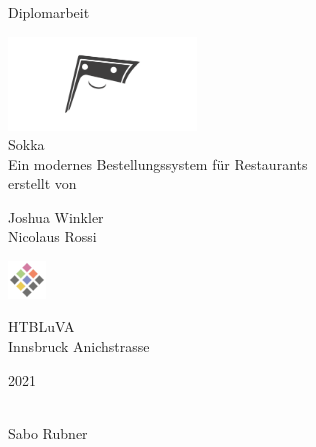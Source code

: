\begin{titlepage}
	\begin{center}
		\Large{Diplomarbeit} \\
		
		\bigskip
		\bigskip
		\bigskip

		\includegraphics[width=5cm]{../images/sokka.png} \\
		\Huge{Sokka} \\
		\bigskip
		\bigskip
		\bigskip
		\huge{Ein modernes Bestellungssystem für Restaurants} \\

		\bigskip
		\bigskip
		\bigskip
		\large{erstellt von} \\

		\bigskip
		\bigskip
		\bigskip
		
		\Huge{Joshua Winkler} \\
		\Huge{Nicolaus Rossi} \\
		\bigskip
		\bigskip
		\bigskip

		
		\bigskip
	    \bigskip
        
        \includegraphics[width=1cm]{../images/htl-logo}

		\Large{HTBLuVA} \\
		\Large{Innsbruck Anichstrasse} \\

		\bigskip		
		\bigskip
		\bigskip
		
		\Large{2021}

	\end{center}

	\bigskip
	\bigskip
	\bigskip
	 \\
	Sabo Rubner
 
\end{titlepage}